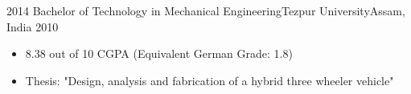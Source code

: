 %
%
%


\begin{experiences}
  \experience
    {2014} {Bachelor of Technology in Mechanical
Engineering}{Tezpur University}{Assam, India}
    {2010}    {
                      \begin{itemize}
                        \item 8.38 out of 10 CGPA (Equivalent German Grade: 1.8)
                        \item Thesis: "Design, analysis and fabrication of a hybrid three wheeler vehicle"                  
                      \end{itemize}
                    }
                    {}
\end{experiences}